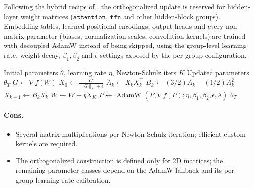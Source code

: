 Following the hybrid recipe of \citet{shen_convergence_2025}, the orthogonalized update is reserved for hidden-layer weight matrices ($\mathtt{attention}$, $\mathtt{ffn}$ and other hidden-block groups). Embedding tables, learned positional encodings, output heads and every non-matrix parameter (biases, normalization scales, convolution kernels) are trained with decoupled AdamW instead of being skipped, using the group-level learning rate, weight decay, $\beta_1, \beta_2$ and $\epsilon$ settings exposed by the per-group configuration.

\begin{algorithm}[H]
\caption{Muon (Newton-Schulz Orthogonalization)}
\label{alg:muon}
\begin{algorithmic}[1]
\Require Initial parameters $\theta$, learning rate $\eta$, Newton-Schulz iters $K$
\Ensure Updated parameters $\theta_T$
        \State $G \gets \nabla f(W)$ 
        \State $X_0 \gets \frac{G}{\|G\|_F + \epsilon}$ 
            \State $A_k \gets X_k X_k^\top$ 
            \State $B_k \gets (3/2) A_k - (1/2) A_k^2$ 
            \State $X_{k+1} \gets B_k X_k$ 
        \EndFor
        \State $W \gets W - \eta X_K$ 
    \Else
        \State $P \gets \operatorname{AdamW}(P, \nabla f(P); \eta, \beta_1, \beta_2, \epsilon, \lambda)$ 
    \EndIf
\EndFor
\Return $\theta_T$
\end{algorithmic}
\end{algorithm}

\paragraph{Cons.}
\begin{itemize}[leftmargin=*]
\item Several matrix multiplications per Newton-Schulz iteration; efficient custom kernels are required.
\item The orthogonalized construction is defined only for 2D matrices; the remaining parameter classes depend on the AdamW fallback and its per-group learning-rate calibration.
\end{itemize}

